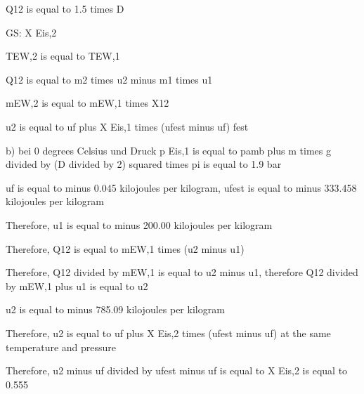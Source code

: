 Q12 is equal to 1.5 times D

GS: X Eis,2

TEW,2 is equal to TEW,1

Q12 is equal to m2 times u2 minus m1 times u1

mEW,2 is equal to mEW,1 times X12

u2 is equal to uf plus X Eis,1 times (ufest minus uf) fest

b) bei 0 degrees Celsius und Druck p Eis,1 is equal to pamb plus m times g divided by (D divided by 2) squared times pi is equal to 1.9 bar

uf is equal to minus 0.045 kilojoules per kilogram, ufest is equal to minus 333.458 kilojoules per kilogram

Therefore, u1 is equal to minus 200.00 kilojoules per kilogram

Therefore, Q12 is equal to mEW,1 times (u2 minus u1)

Therefore, Q12 divided by mEW,1 is equal to u2 minus u1, therefore Q12 divided by mEW,1 plus u1 is equal to u2

u2 is equal to minus 785.09 kilojoules per kilogram

Therefore, u2 is equal to uf plus X Eis,2 times (ufest minus uf) at the same temperature and pressure

Therefore, u2 minus uf divided by ufest minus uf is equal to X Eis,2 is equal to 0.555